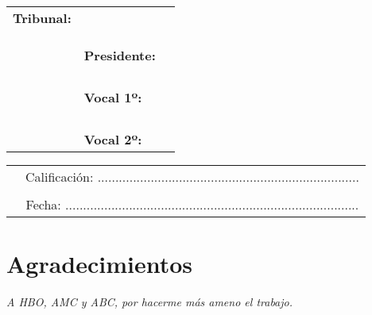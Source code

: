 \vspace{1cm}
\begin{center}
  \begin{tabular}{rll}
    \textbf{Tribunal:} & &\\ \\ \\
    &&\\
    & \textbf{Presidente:} \\ \\ \\
    \\
    &&\\
    & \textbf{Vocal 1º:}& \\ \\ \\
    \\
    &&\\
    & \textbf{Vocal 2º:}& 
  \end{tabular}
\end{center}


\vspace{15mm}
\begin{tabular}{p{3cm}c}
  &Calificación: ..........................................................................\\ \\
  &Fecha: ...................................................................................
\end{tabular}

\normalsize





\clearemptydoublepage
\chapter*{Agradecimientos}

\begin{flushright}
  \vspace{10mm}
  \emph{A HBO, AMC y ABC, por hacerme más ameno el trabajo.}\hspace{1cm}\\
\end{flushright}


\clearemptydoublepage

\tableofcontents
\listoffigures
\listoftables
\setlength{\parskip}{2mm}

